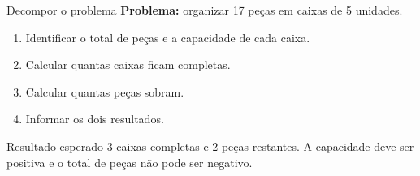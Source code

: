 \begin{frame}[t]{Decompor o problema}
\textbf{Problema:} organizar 17 peças em caixas de 5 unidades.
\begin{enumerate}
\item Identificar o total de peças e a capacidade de cada caixa.
\item Calcular quantas caixas ficam completas.
\item Calcular quantas peças sobram.
\item Informar os dois resultados.
\end{enumerate}
\begin{exampleblock}{Resultado esperado}
3 caixas completas e 2 peças restantes. A capacidade deve ser positiva e o total de peças não pode ser negativo.
\end{exampleblock}
\end{frame}
